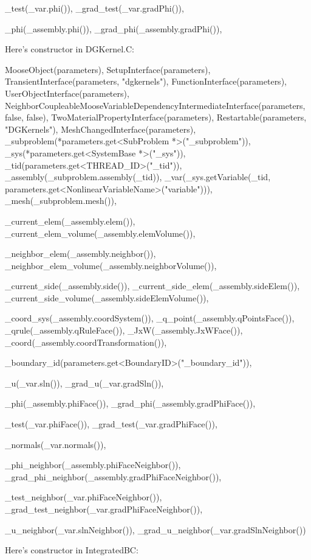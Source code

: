     _test(_var.phi()),
    _grad_test(_var.gradPhi()),

    _phi(_assembly.phi()),
    _grad_phi(_assembly.gradPhi()),

Here's constructor in DGKernel.C:

    MooseObject(parameters),
    SetupInterface(parameters),
    TransientInterface(parameters, "dgkernels"),
    FunctionInterface(parameters),
    UserObjectInterface(parameters),
    NeighborCoupleableMooseVariableDependencyIntermediateInterface(parameters, false, false),
    TwoMaterialPropertyInterface(parameters),
    Restartable(parameters, "DGKernels"),
    MeshChangedInterface(parameters),
    _subproblem(*parameters.get<SubProblem *>("_subproblem")),
    _sys(*parameters.get<SystemBase *>("_sys")),
    _tid(parameters.get<THREAD_ID>("_tid")),
    _assembly(_subproblem.assembly(_tid)),
    _var(_sys.getVariable(_tid, parameters.get<NonlinearVariableName>("variable"))),
    _mesh(_subproblem.mesh()),

    _current_elem(_assembly.elem()),
    _current_elem_volume(_assembly.elemVolume()),

    _neighbor_elem(_assembly.neighbor()),
    _neighbor_elem_volume(_assembly.neighborVolume()),

    _current_side(_assembly.side()),
    _current_side_elem(_assembly.sideElem()),
    _current_side_volume(_assembly.sideElemVolume()),

    _coord_sys(_assembly.coordSystem()),
    _q_point(_assembly.qPointsFace()),
    _qrule(_assembly.qRuleFace()),
    _JxW(_assembly.JxWFace()),
    _coord(_assembly.coordTransformation()),

    _boundary_id(parameters.get<BoundaryID>("_boundary_id")),

    _u(_var.sln()),
    _grad_u(_var.gradSln()),

    _phi(_assembly.phiFace()),
    _grad_phi(_assembly.gradPhiFace()),

    _test(_var.phiFace()),
    _grad_test(_var.gradPhiFace()),

    _normals(_var.normals()),

    _phi_neighbor(_assembly.phiFaceNeighbor()),
    _grad_phi_neighbor(_assembly.gradPhiFaceNeighbor()),

    _test_neighbor(_var.phiFaceNeighbor()),
    _grad_test_neighbor(_var.gradPhiFaceNeighbor()),

    _u_neighbor(_var.slnNeighbor()),
    _grad_u_neighbor(_var.gradSlnNeighbor())

Here's constructor in IntegratedBC:

